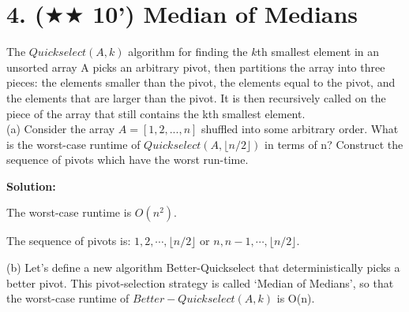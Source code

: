 \documentclass{article}
\begin{document}
\section*{4. ($\bigstar\bigstar$ 10') Median of Medians }
The $Quickselect(A, k)$ algorithm for finding the $k$th smallest element in an unsorted array
A picks an arbitrary pivot, then partitions the array into three pieces: the elements smaller than
the pivot, the elements equal to the pivot, and the elements that are larger than the pivot.
It is then recursively called on the piece of the array that still contains the kth smallest
element.\\

(a) Consider the array $A = [1, 2, . . . , n]$ shuffled into some arbitrary order. What is the
worst-case runtime of $Quickselect(A, \lfloor n/2\rfloor)$ in terms of n? Construct the sequence of pivots which have the worst run-time.
{\color{blue}
\par\textbf{Solution: }
\par The worst-case runtime is $O(n^2)$. 
\par The sequence of pivots is: $1, 2, \cdots, \lfloor n/2\rfloor$ or $n, n-1, \cdots, \lfloor n/2\rfloor$.
}
\vspace{0.3in}

(b) Let’s define a new algorithm Better-Quickselect that deterministically picks a better
pivot. This pivot-selection strategy is called ‘Median of Medians’, so that the worst-case
runtime of $Better-Quickselect(A, k)$ is O(n).\\

\end{document}
